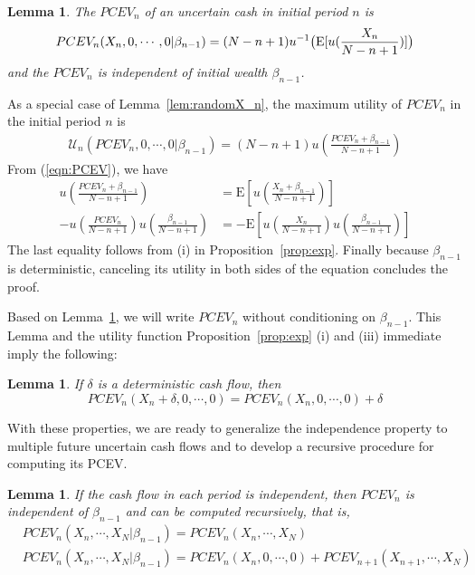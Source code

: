 \documentclass{article}[12pt letter]
\newtheorem{lemma}[theorem]{Lemma}
\newcommand{\E}{\mathrm{E}}
\begin{document}
\begin{lemma} \label{lem:pcev-Xn}
The $PCEV_n$ of an uncertain cash in initial period $n$ is
\begin{align} \label{eqn:pcev-Xn}
PCEV_n(X_n,0,\cdots, 0|\beta_{n-1}) = (N-n+1)u^{-1}\big{(} \E [u(\frac{X_n}{N-n+1})]\big{)} 
\end{align}
and the $PCEV_n$ is independent of initial wealth $\beta_{n-1}$.
\end{lemma}
\proof
As a special case of Lemma~\ref{lem:randomX_n}, the maximum utility of  $PCEV_n$ in the initial period $n$ is
\begin{align*} 
    \mathcal{U}_n(PCEV_n, 0,\cdots,0|\beta_{n-1}) = (N-n+1)u(\frac{PCEV_n+\beta_{n-1}}{N-n+1})
\end{align*}
From (\ref{eqn:PCEV}), we have
\begin{align*}
u(\frac{PCEV_n + \beta_{n-1}}{N-n+1})   &=  \E[u(\frac{X_n + \beta_{n-1}}{N-n+1})]\\
-u(\frac{PCEV_n}{N-n+1})u(\frac{\beta_{n-1}}{N-n+1}) &= -\E [u(\frac{X_n}{N-n+1})u(\frac{\beta_{n-1}}{N-n+1})]
\end{align*}
The last equality follows from (i) in Proposition~\ref{prop:exp}.  Finally because $\beta_{n-1}$ is deterministic, canceling its utility in both sides of the equation concludes the proof.
\endproof



Based on Lemma~\ref{lem:pcev-Xn}, we will write $PCEV_n$ without conditioning on $\beta_{n-1}$.
This Lemma and the utility function Proposition~\ref{prop:exp}  (i) and (iii) immediate imply the following:
\begin{lemma}\label{lem:delta}
If $\delta$ is a deterministic cash flow, then
\[PCEV_n(X_n+\delta,0,\cdots,0) = PCEV_n(X_n,0,\cdots,0) + \delta\]
\end{lemma}

With these properties, we are ready to generalize the independence property to multiple future uncertain cash flows and to develop a recursive procedure for computing its PCEV.

\begin{lemma}\label{lemma:indCF}
If the cash flow in each period is independent, then $PCEV_n$ is independent of $\beta_{n-1}$ and can be computed recursively, that is,
\begin{align}
&PCEV_n(X_n,\cdots,X_N|\beta_{n-1}) = PCEV_n(X_n,\cdots, X_N) \label{eqn:pcev-ind} \\
&PCEV_n(X_n, \cdots, X_N|\beta_{n-1}) = PCEV_n(X_n, 0, \cdots, 0) + PCEV_{n+1} (X_{n+1}, \cdots, X_N) \label{eqn:pcev-recur}
\end{align}
\end{lemma}
\end{document}
